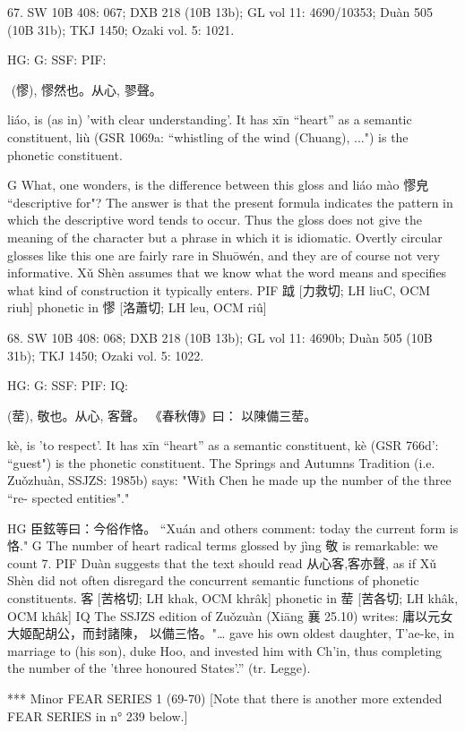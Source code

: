 67. SW 10B 408: 067; DXB 218 (10B 13b); GL vol 11: 4690/10353; Duàn 505 (10B 31b); TKJ 1450; Ozaki vol. 5: 1021.


HG:
G: SSF: PIF:

 (憀), 憀然也。从心,
翏聲。


liáo,
is (as in) 'with clear understanding'.
It has xīn ``heart'' as a semantic constituent,
liù (GSR 1069a: ``whistling of the wind (Chuang), ...") is the phonetic constituent.

G What, one wonders, is the difference between this gloss and liáo mào 憀皃 ``descriptive for"? The answer is that the present formula indicates the pattern in which the descriptive word tends to occur. Thus the gloss does not give the meaning of the character but a phrase in which it is idiomatic.
    Overtly circular glosses like this one are fairly rare in Shuōwén, and they are of course not very informative. Xǔ Shèn assumes that we know what the word means and specifies what kind of construction it typically enters.
PIF  䟠 [力救切; LH liuC, OCM riuh] phonetic in 憀 [洛蕭切; LH leu, OCM riû]



68. SW 10B 408: 068; DXB 218 (10B 13b); GL vol 11: 4690b; Duàn 505 (10B 31b); TKJ 1450; Ozaki vol. 5: 1022.



HG:
G: SSF: PIF: IQ:

(䓨),
敬也。从心, 客聲。
《春秋傳》曰：
以陳備三䓨。

kè,
is 'to respect'.
It has xīn ``heart'' as a semantic constituent,
kè (GSR 766d': ``guest") is the phonetic constituent.
The Springs and Autumns Tradition (i.e. Zuǒzhuàn, SSJZS: 1985b) says:
"With Chen he made up the number of the three ``re- spected entities"."

HG     臣鉉等曰：今俗作恪。 ``Xuán and others comment: today the current form is 恪."
G	The number of heart radical terms glossed by jìng 敬 is remarkable: we count 7.
PIF     Duàn suggests that the text should read 从心客,客亦聲, as if Xǔ Shèn did not often disregard the concurrent semantic functions of phonetic constituents.
客 [苦格切; LH khak, OCM khrâk] phonetic in 䓨 [苦各切; LH khâk, OCM khâk]
IQ The SSJZS edition of Zuǒzuàn (Xiāng 襄 25.10) writes: 庸以元女大姬配胡公，而封諸陳， 以備三恪。"… gave his own oldest daughter, T'ae-ke, in marriage to (his son), duke Hoo, and invested him with Ch'in, thus completing the number of the 'three honoured States'.'' (tr. Legge).


***
Minor FEAR SERIES 1 (69-70)
[Note that there is another more extended FEAR SERIES in n° 239 below.]

